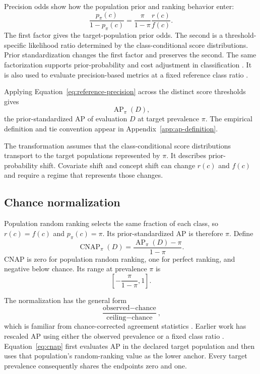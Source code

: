 \documentclass[11pt]{article}
\newcommand{\AP}{\operatorname{AP}}
\newcommand{\CNAP}{\operatorname{CNAP}}
\theoremstyle{remark}
\begin{document}
Precision odds show how the population prior and ranking behavior enter:
\begin{equation}
\frac{p_\pi(c)}{1-p_\pi(c)}
=
\frac{\pi}{1-\pi}
\frac{r(c)}{f(c)}.
\label{eq:precision-odds}
\end{equation}
The first factor gives the target-population prior odds. The second is a threshold-specific likelihood ratio determined by the class-conditional score distributions. Prior standardization changes the first factor and preserves the second. The same factorization supports prior-probability and cost adjustment in classification \cite{elkan2001foundations}. It is also used to evaluate precision-based metrics at a fixed reference class ratio \cite{siblini2020calibration,degeest2016online}.

Applying Equation~\eqref{eq:reference-precision} across the distinct score thresholds gives
\[
\AP_\pi(D),
\]
the prior-standardized AP of evaluation $D$ at target prevalence $\pi$. The empirical definition and tie convention appear in Appendix~\ref{app:ap-definition}.

The transformation assumes that the class-conditional score distributions transport to the target populations represented by $\pi$. It describes prior-probability shift. Covariate shift and concept shift can change $r(c)$ and $f(c)$ and require a regime that represents those changes.

\subsection{Chance normalization}

Population random ranking selects the same fraction of each class, so $r(c)=f(c)$ and $p_\pi(c)=\pi$. Its prior-standardized AP is therefore $\pi$. Define
\begin{equation}
\CNAP_\pi(D)
=
\frac{\AP_\pi(D)-\pi}{1-\pi}.
\label{eq:cnap}
\end{equation}
CNAP is zero for population random ranking, one for perfect ranking, and negative below chance. Its range at prevalence $\pi$ is
\[
\left[-\frac{\pi}{1-\pi},1\right].
\]

The normalization has the general form
\[
\frac{\text{observed}-\text{chance}}
{\text{ceiling}-\text{chance}},
\]
which is familiar from chance-corrected agreement statistics \cite{cohen1960coefficient}. Earlier work has rescaled AP using either the observed prevalence or a fixed class ratio \cite{suyuan2015relationship,bestgen2021fisher}. Equation~\eqref{eq:cnap} first evaluates AP in the declared target population and then uses that population's random-ranking value as the lower anchor. Every target prevalence consequently shares the endpoints zero and one.
\end{document}
